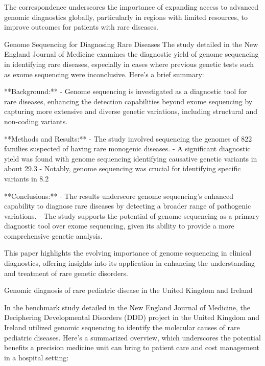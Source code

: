 The correspondence underscores the importance of expanding access to advanced genomic diagnostics globally, particularly in regions with limited resources, to improve outcomes for patients with rare diseases.



\citep{wojcik2024genome}
Genome Sequencing for Diagnosing Rare Diseases
The study detailed in the New England Journal of Medicine examines the diagnostic yield of genome sequencing in identifying rare diseases, especially in cases where previous genetic tests such as exome sequencing were inconclusive. Here's a brief summary:

**Background:**
- Genome sequencing is investigated as a diagnostic tool for rare diseases, enhancing the detection capabilities beyond exome sequencing by capturing more extensive and diverse genetic variations, including structural and non-coding variants.

**Methods and Results:**
- The study involved sequencing the genomes of 822 families suspected of having rare monogenic diseases.
- A significant diagnostic yield was found with genome sequencing identifying causative genetic variants in about 29.3%
- Notably, genome sequencing was crucial for identifying specific variants in 8.2%

**Conclusions:**
- The results underscore genome sequencing's enhanced capability to diagnose rare diseases by detecting a broader range of pathogenic variations.
- The study supports the potential of genome sequencing as a primary diagnostic tool over exome sequencing, given its ability to provide a more comprehensive genetic analysis.

This paper highlights the evolving importance of genome sequencing in clinical diagnostics, offering insights into its application in enhancing the understanding and treatment of rare genetic disorders.

\citep{wright2023genomic}
Genomic diagnosis of rare pediatric disease in the United Kingdom and Ireland

In the benchmark study detailed in the New England Journal of Medicine, the Deciphering Developmental Disorders (DDD) project in the United Kingdom and Ireland utilized genomic sequencing to identify the molecular causes of rare pediatric diseases. Here’s a summarized overview, which underscores the potential benefits a precision medicine unit can bring to patient care and cost management in a hospital setting:


